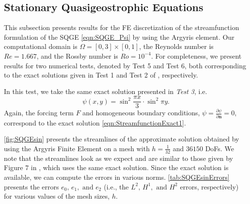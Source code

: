 \subsection{Stationary Quasigeostrophic Equations}\label{sse:SQGE}
This subsection presents results for the FE discretization of the streamfunction
formulation of the SQGE \eqref{eqn:SQGE_Psi} by using the Argyris element. Our
computational domain is $\Omega=[0,3]\times[0,1]$, the Reynolds number is
$Re=1.667$, and the Rossby number is $Ro=10^{-4}$.  For completeness, we present
results for two numerical tests, denoted by Test 5 and Test 6, both
corresponding to the exact solutions given in Test 1 and Test 2 of
\cite{Cascon}, respectively.

In this test, we take the same exact solution presented in \emph{Test 3}, i.e.
\begin{equation}
  \psi(x,y) = \sin^2 \frac{\pi x}{3} \cdot \sin^2 \pi y.
  \label{eqn:StreamfunctionExact1}
\end{equation}
Again, the forcing term $F$ and homogeneous boundary conditions, $\psi = \frac{\partial
\psi}{\partial \mathbf{n}} = 0$, correspond to the exact solution \eqref{eqn:StreamfunctionExact1}.

\autoref{fig:SQGEsin} presents the streamlines of the approximate solution
obtained by using the Argyris Finite Element on a mesh with $h=\frac{1}{32}$ and
$36150$ DoFs. We note that the streamlines look as we expect and are similar to
those given by Figure $7$ in \cite{Myers}, which uses the same exact solution.
Since the exact solution is available, we can compute the errors in various
norms. \autoref{tab:SQGEsinErrors} presents the errors $e_0,\, e_1, \text{ and }
e_2$ (i.e., the $L^2,\, H^1, \text{ and } H^2$ errors, respectively) for various
values of the mesh sizes, $h$.


